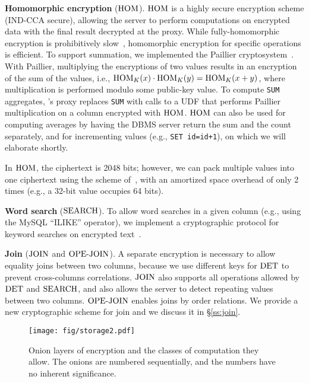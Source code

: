 \textbf{Homomorphic encryption} ($\textrm{HOM}$)\@. $\textrm{HOM}$ is a highly secure
encryption scheme (IND-CCA secure), allowing the server to perform
computations on encrypted data with the final result decrypted at the
proxy. While fully-homomorphic encryption is prohibitively
slow~\cite{trillion}, homomorphic encryption for specific operations
is efficient.  To support summation, we implemented the Paillier
cryptosystem~\cite{Paillier99}.  With Paillier, multiplying the
encryptions of two values results in an encryption of the sum of the
values, i.e., $\textrm{HOM}_K(x) \cdot \textrm{HOM}_K(y) = \textrm{HOM}_K(x+y)$, where
multiplication is performed modulo some public-key value.  To compute
{\tt SUM} aggregates, \name's proxy replaces {\tt SUM} with calls to a
UDF that performs Paillier multiplication on a column encrypted with
$\textrm{HOM}$.  $\textrm{HOM}$ can also be used for computing averages by having the
DBMS server return the sum and the count separately, and for
incrementing values (e.g., {\tt SET id=id+1}), on which we will
elaborate shortly.

In $\textrm{HOM}$, the ciphertext is 2048 bits; however, we can pack
multiple values into one ciphertext using the scheme
of~\cite{GeZ07}, with an amortized space overhead of only 2 times
(e.g., a 32-bit value occupies 64 bits).

\textbf{Word search} ($\textrm{SEARCH}$)\@.  To allow word searches in a given
column (e.g., using the MySQL ``ILIKE'' operator), we implement a
cryptographic protocol for keyword searches on encrypted
text~\cite{Dawn-Song-Search-2000, amanatidis-boldyreva-o'neill}.

\textbf{Join} ($\textrm{JOIN}$ and $\textrm{OPE-JOIN}$)\@.  A separate encryption
is necessary to allow equality joins between two columns, because we
use different keys for $\textrm{DET}$ to prevent cross-columns correlations.   $\textrm{JOIN}$ also supports all operations allowed by $\textrm{DET}$ and
$\textrm{SEARCH}$, and also allows the server to detect repeating values
between two columns.  $\textrm{OPE-JOIN}$ enables joins by order relations. We provide a new cryptographic scheme for join and we discuss it in \S\ref{ss:join}.

\begin{figure}[t!]
\centering
\texttt{[image: fig/storage2.pdf]}
\caption{Onion layers of encryption and the classes of computation they allow.
         The onions are numbered sequentially, and the numbers have no inherent
         significance.}
\label{fig:onion}
\end{figure}

